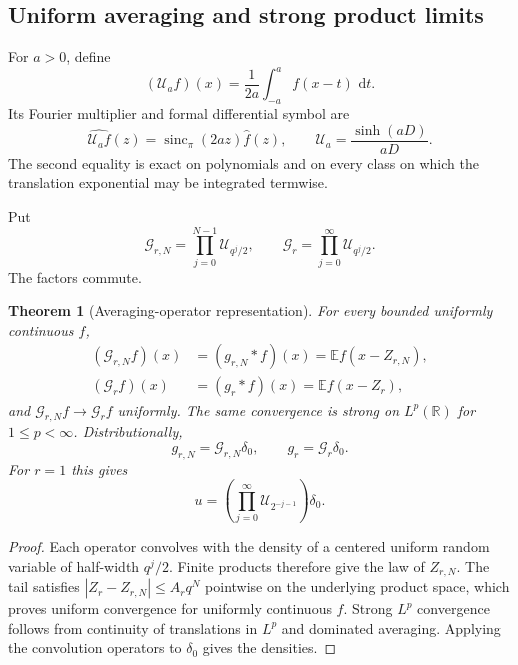 \documentclass[11pt,oneside]{article}
\numberwithin{equation}{section}
\newtheorem{theorem}{Theorem}[section]
\theoremstyle{definition}
\theoremstyle{remark}
\newcommand{\R}{\mathbb R}
\newcommand{\E}{\mathbb E}
\newcommand{\sincpi}{\operatorname{sinc}_{\pi}}
\newcommand{\dd}{\,\mathrm d}
\newcommand{\cU}{\mathcal U}
\newcommand{\cG}{\mathcal G}
\begin{document}
\subsection{Uniform averaging and strong product limits}

For $a>0$, define
\begin{equation}
 (\cU_af)(x)=\frac1{2a}\int_{-a}^{a}f(x-t)\,\dd t.         \label{eq:Ua-def}
\end{equation}
Its Fourier multiplier and formal differential symbol are
\begin{equation}
 \widehat{\cU_af}(z)=\sincpi(2az)\widehat f(z),
 \qquad
 \cU_a=\frac{\sinh(aD)}{aD}.                              \label{eq:Ua-symbol}
\end{equation}
The second equality is exact on polynomials and on every class on which the
translation exponential may be integrated termwise.

Put
\begin{equation}
 \cG_{r,N}=\prod_{j=0}^{N-1}\cU_{q^j/2},
 \qquad
 \cG_r=\prod_{j=0}^{\infty}\cU_{q^j/2}.                  \label{eq:Gr-operator}
\end{equation}
The factors commute.

\begin{theorem}[Averaging-operator representation]
\label{thm:averaging-operator}
For every bounded uniformly continuous $f$,
\begin{align}
 (\cG_{r,N}f)(x)&=(g_{r,N}*f)(x)=\E f(x-Z_{r,N}),          \label{eq:GrN-convolution}\\
 (\cG_rf)(x)&=(g_r*f)(x)=\E f(x-Z_r),                     \label{eq:Gr-convolution}
\end{align}
and $\cG_{r,N}f\to\cG_rf$ uniformly.  The same convergence is strong on
$L^p(\R)$ for $1\le p<\infty$.  Distributionally,
\begin{equation}
 g_{r,N}=\cG_{r,N}\delta_0,
 \qquad
 g_r=\cG_r\delta_0.                                       \label{eq:g-operator-delta}
\end{equation}
For $r=1$ this gives
\begin{equation}
 u=\left(\prod_{j=0}^{\infty}\cU_{2^{-j-1}}\right)\delta_0. \label{eq:u-averaging-product}
\end{equation}
\end{theorem}

\begin{proof}
Each operator convolves with the density of a centered uniform random variable
of half-width $q^j/2$.  Finite products therefore give the law of $Z_{r,N}$.
The tail satisfies $|Z_r-Z_{r,N}|\le A_rq^N$ pointwise on the underlying
product space, which proves uniform convergence for uniformly continuous $f$.
Strong $L^p$ convergence follows from continuity of translations in $L^p$ and
dominated averaging.  Applying the convolution operators to $\delta_0$ gives
the densities.
\end{proof}
\end{document}
